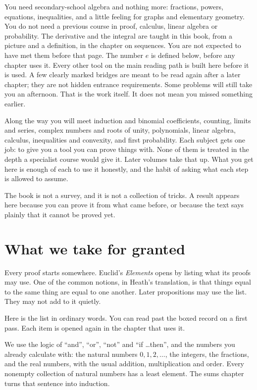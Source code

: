 You need secondary-school algebra and nothing more: fractions, powers, equations, inequalities, and a little feeling for graphs and elementary geometry. You do not need a previous course in proof, calculus, linear algebra or probability. The derivative and the integral are taught in this book, from a picture and a definition, in the chapter on sequences. You are not expected to have met them before that page. The number $e$ is defined below, before any chapter uses it. Every other tool on the main reading path is built here before it is used. A few clearly marked bridges are meant to be read again after a later chapter; they are not hidden entrance requirements. Some problems will still take you an afternoon. That is the work itself. It does not mean you missed something earlier.

Along the way you will meet induction and binomial coefficients, counting, limits and series, complex numbers and roots of unity, polynomials, linear algebra, calculus, inequalities and convexity, and first probability. Each subject gets one job: to give you a tool you can prove things with. None of them is treated in the depth a specialist course would give it. Later volumes take that up. What you get here is enough of each to use it honestly, and the habit of asking what each step is allowed to assume.

The book is not a survey, and it is not a collection of tricks. A result appears here because you can prove it from what came before, or because the text says plainly that it cannot be proved yet.

\section*{What we take for granted}
Every proof starts somewhere. Euclid's \emph{Elements} opens by listing what its proofs may use. One of the common notions, in Heath's translation, is that things equal to the same thing are equal to one another. Later propositions may use the list. They may not add to it quietly.

Here is the list in ordinary words. You can read past the boxed record on a first pass. Each item is opened again in the chapter that uses it.

We use the logic of ``and'', ``or'', ``not'' and ``if \dots then'', and the numbers you already calculate with: the natural numbers $0,1,2,\ldots$, the integers, the fractions, and the real numbers, with the usual addition, multiplication and order. Every nonempty collection of natural numbers has a least element. The sums chapter turns that sentence into induction.

